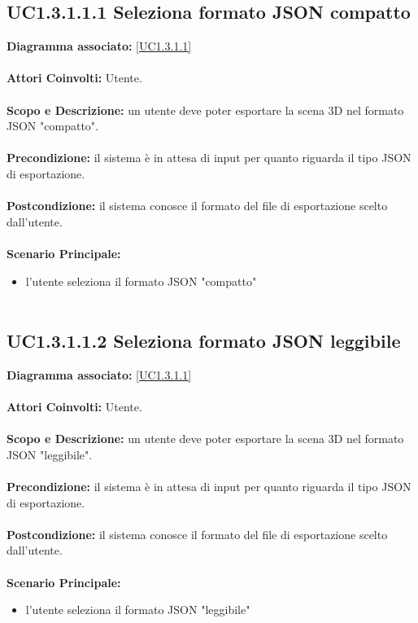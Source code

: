 \subsection{UC1.3.1.1.1 Seleziona formato JSON compatto}
\textbf{Diagramma associato:}
\ref{UC1.3.1.1} \\ \\
\textbf{Attori Coinvolti:}
Utente. \\ \\
\textbf{Scopo e Descrizione:}
un utente deve poter esportare la scena 3D nel formato JSON "compatto". \\ \\
\textbf{Precondizione:}
il sistema è in attesa di input per quanto riguarda il tipo JSON di esportazione. \\ \\
\textbf{Postcondizione:}
il sistema conosce il formato del file di esportazione scelto dall'utente. \\ \\
\textbf{Scenario Principale:}
\begin{itemize}
\item l'utente seleziona il formato JSON "compatto"
\\ \\ \end{itemize}


\subsection{UC1.3.1.1.2 Seleziona formato JSON leggibile}
\textbf{Diagramma associato:}
\ref{UC1.3.1.1} \\ \\
\textbf{Attori Coinvolti:}
Utente. \\ \\
\textbf{Scopo e Descrizione:}
un utente deve poter esportare la scena 3D nel formato JSON "leggibile". \\ \\
\textbf{Precondizione:}
il sistema è in attesa di input per quanto riguarda il tipo JSON di esportazione. \\ \\
\textbf{Postcondizione:}
il sistema conosce il formato del file di esportazione scelto dall'utente. \\ \\
\textbf{Scenario Principale:}
\begin{itemize}
\item l'utente seleziona il formato JSON "leggibile"
\\ \\ \end{itemize}


